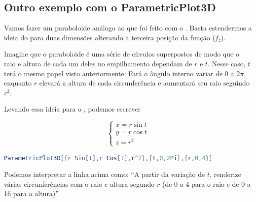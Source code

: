 \documentclass[a4paper, 12pt]{article}
\begin{document}
\newpage
\subsection{Outro exemplo com o ParametricPlot3D}

Vamos fazer um paraboloide análogo ao que foi feito com o . Basta estendermos a ideia do  para duas dimensões alterando a terceira posição da função ($f_{z}$). 

Imagine que o paraboloide é uma série de círculos superpostos de modo que o raio e altura de cada um deles no empilhamento dependam de $r$ e $t$. Nesse caso, $t$ terá o mesmo papel visto anteriormente: Fará o ângulo interno variar de 0 a $2\pi$, enquanto $r$ elevará a altura de cada circunferência e aumentará seu raio seguindo $r^{2}$.

Levando essa ideia para o , podemos escrever

$$
\begin{cases}
	x=r\sin t\\
	y=r\cos t\\
	z=r^{2}
\end{cases}
$$

\begin{lstlisting}[language=Mathematica]
ParametricPlot3D[{r Sin[t],r Cos[t],r^2},{t,0,2Pi},{r,0,4}]
\end{lstlisting}

Podemos interpretar a linha acima como: ``A partir da variação de $t$, renderize várias circunferências com o raio e altura segundo $r$ (de 0 a 4 para o raio e de 0 a 16 para a altura)''
\end{document}
